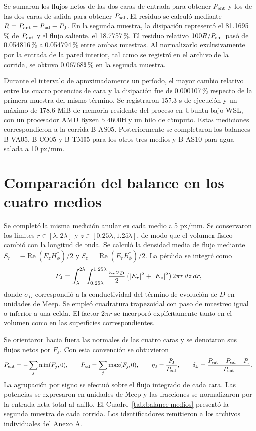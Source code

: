 Se sumaron los flujos netos de las dos caras de entrada para obtener $P_{\rm ent}$ y los de las dos caras de salida para obtener $P_{\rm sal}$. El residuo se calculó mediante $R=P_{\rm ent}-P_{\rm sal}-P_{\rm J}$. En la segunda muestra, la disipación representó el 81.1695\,\% de $P_{\rm ent}$ y el flujo saliente, el 18.7757\,\%. El residuo relativo $100R/P_{\rm ent}$ pasó de 0.054816\,\% a 0.054794\,\% entre ambas muestras. Al normalizarlo exclusivamente por la entrada de la pared interior, tal como se registró en el archivo de la corrida, se obtuvo 0.067689\,\% en la segunda muestra.

Durante el intervalo de aproximadamente un período, el mayor cambio relativo entre las cuatro potencias de cara y la disipación fue de 0.000107\,\% respecto de la primera muestra del mismo término. Se registraron 157.3 s de ejecución y un máximo de 178.6 MiB de memoria residente del proceso en Ubuntu bajo WSL, con un procesador AMD Ryzen 5 4600H y un hilo de cómputo. Estas mediciones correspondieron a la corrida B-AS05. Posteriormente se completaron los balances B-VA05, B-CO05 y B-TM05 para los otros tres medios y B-AS10 para agua salada a 10 px/mm.

\section{Comparación del balance en los cuatro medios}\label{sec:balance-comparativo}
Se completó la misma medición anular en cada medio a 5 px/mm. Se conservaron los límites $r\in[\lambda,2\lambda]$ y $z\in[0.25\lambda,1.25\lambda]$, de modo que el volumen físico cambió con la longitud de onda. Se calculó la densidad media de flujo mediante $S_r=-\operatorname{Re}(E_zH_\phi^*)/2$ y $S_z=\operatorname{Re}(E_rH_\phi^*)/2$. La pérdida se integró como
\begin{equation}
 P_{\rm J}=\int_{\lambda}^{2\lambda}\int_{0.25\lambda}^{1.25\lambda}
 \frac{\varepsilon_r\sigma_D}{2}\left(|E_r|^2+|E_z|^2\right)2\pi r\, dz\,dr,
 \label{eq:joule-anular}
\end{equation}
donde $\sigma_D$ correspondió a la conductividad del término de evolución de $D$ en unidades de Meep. Se empleó cuadratura trapezoidal con paso de muestreo igual o inferior a una celda. El factor $2\pi r$ se incorporó explícitamente tanto en el volumen como en las superficies correspondientes.

Se orientaron hacia fuera las normales de las cuatro caras y se denotaron sus flujos netos por $F_j$. Con esta convención se obtuvieron
\begin{equation}
 P_{\rm ent}=-\sum_j\min(F_j,0),\qquad
 P_{\rm sal}=\sum_j\max(F_j,0),\qquad
 \eta_{\rm J}=\frac{P_{\rm J}}{P_{\rm ent}},\qquad
 \delta_{\rm B}=\frac{P_{\rm ent}-P_{\rm sal}-P_{\rm J}}{P_{\rm ent}}.
 \label{eq:balance-normalizado}
\end{equation}
La agrupación por signo se efectuó sobre el flujo integrado de cada cara. Las potencias se expresaron en unidades de Meep y las fracciones se normalizaron por la entrada neta total al anillo. El Cuadro~\ref{tab:balance-medios} presentó la segunda muestra de cada corrida. Los identificadores remitieron a los archivos individuales del \hyperref[an:balance-registros]{Anexo A}.

